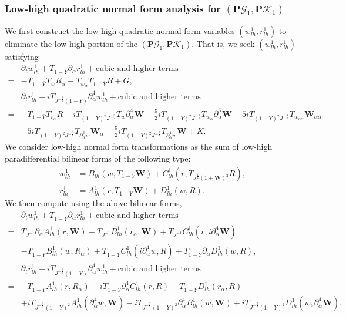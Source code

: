 \documentclass[10pt]{amsart}
\theoremstyle{remark}
\theoremstyle{definition}
\numberwithin{equation}{section}
\newcommand{\p}{\partial}
\newcommand{\al}{\alpha}
\newcommand{\f}{\frac}
\newcommand{\bw}{\mathbf{W}}
\newcommand{\nP}{{\mathbf P}}
\begin{document}
\subsubsection{Low-high quadratic normal form analysis for $(\nP\mathcal{G}_1, \nP\mathcal{K}_1)$} 
We first construct the low‑high quadratic normal form variables $(w^1_{lh}, r^1_{lh})$ to eliminate the low-high portion of the $(\nP\mathcal{G}_1, \nP\mathcal{K}_1)$.
That is, we seek $(w^1_{lh}, r^1_{lh})$ satisfying
\begin{align*}
 &\p_tw^1_{lh}+T_{1-\bar{Y}}\p_\al r^1_{lh} + \text{cubic and higher terms}\\
 =&  -T_{1-\bar{Y}} T_w R_{\al}-T_{w_{\al}}T_{1-\bar{Y}}R + G,\\
&\p_tr^1_{lh}-iT_{J^{-\frac{3}{2}}(1-Y)}\p_\al^4w^1_{lh} + \text{cubic and higher terms}\\
=& -T_{1-\bar{Y}}T_{r_{\al}}R -iT_{(1-Y)^2J^{-\f32}}T_{w}\p^4_{\al}\mathbf{W} -\f52iT_{(1-Y)^2J^{-\f32}}T_{w_{\al}}\p^3_{\al}\mathbf{W} -5iT_{(1-Y)^2J^{-\f32}}T_{w_{\al\al}} \mathbf{W}_{\al\al} \\
  &-5iT_{(1-Y)^2J^{-\f32}}T_{\p_{\al}^3w}\mathbf{W}_{\al} -\f52iT_{(1-Y)^2J^{-\f32}}T_{\p_{\al}^4w} \bw+K.   
\end{align*}
We consider low-high normal form transformations as the sum of low-high paradifferential bilinear forms of the following type:
\begin{equation*} %
\begin{aligned}
w^1_{lh} &= B^1_{lh}\left(w, T_{1-Y}\bw \right) + C^1_{lh}\left(r, T_{J^{\frac{1}{2}}(1+\bw)^2}R \right),\\
r^1_{lh} &= A^1_{lh} \left(r, T_{1-Y}\bw \right) + D^1_{lh}\left(w, R\right).
\end{aligned}
\end{equation*}
We then compute using the above bilinear forms,
\begin{align*}
&\partial_t w^1_{lh}+T_{1-\bar{Y}} \partial_\alpha r^1_{lh} + \text{cubic and higher terms} \\
=& T_{J^{-1}}\partial_\alpha A^1_{lh}(r, \bw) -T_{J^{-1}}B^1_{lh}(r_\alpha, \bw) +  T_{J^{-1}}C^1_{lh}(r, i\p_\al^4\bw) \\
 &-T_{1-\bar{Y}}B^1_{lh}(w, R_\alpha)+T_{1-\bar{Y}}C^1_{lh}(i\p_\al^4w, R) + T_{1-\bar{Y}}\partial_\alpha D^1_{lh}(w, R),\\
&\partial_t r^1_{lh}  -iT_{J^{-\frac{3}{2}}(1-Y)}\p_\al^4 w^1_{lh}+ \text{cubic and higher  terms} \\
=& -T_{1-\bar{Y}}A^1_{lh}(r, R_\alpha) - iT_{1-\bar{Y}}\partial_\alpha^4 C^1_{lh}(r, R) - T_{1-\bar{Y}}D^1_{lh}(r_\alpha, R)\\
&+ iT_{J^{-\f32}(1-Y)^2}A^1_{lh}(\p_\al^4w, \bw) -iT_{J^{-\f32}(1-Y)^2}\partial_\alpha^4 B^1_{lh}(w, \bw) +iT_{J^{-\f32}(1-Y)^2}D^1_{lh}(w, \p_\al^4\bw).
\end{align*}
\end{document}

